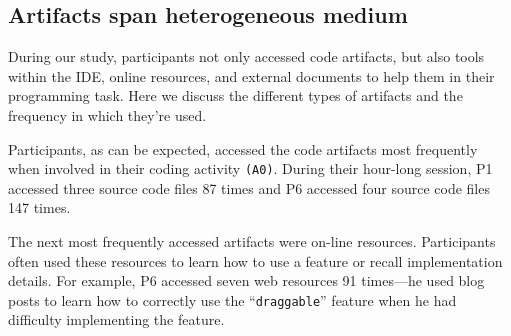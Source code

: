 




\subsection{Artifacts span heterogeneous medium}
During our study, participants not only accessed code artifacts, but also tools within the IDE, online resources, and external documents to help them in their programming task. Here we discuss the different types of artifacts and the frequency in which they're used.

Participants, as can be expected, accessed the code artifacts most frequently when involved in their coding activity \texttt{(A0)}. During their hour-long session, P1 accessed three source code files 87 times and P6 accessed four source code files 147 times. 

The next most frequently accessed artifacts were on-line resources. Participants often used these resources to learn how to use a feature or recall implementation details. For example, P6 accessed seven web resources 91 times---he used blog posts to learn how to correctly use the ``\texttt{draggable}'' feature when he had difficulty implementing the feature. 

